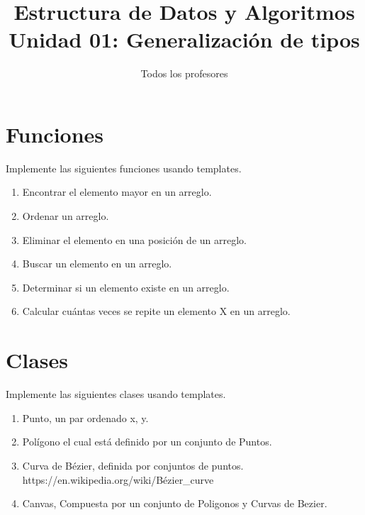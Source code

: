 \documentclass{article}
\title{Estructura de Datos y Algoritmos \\
  \large Unidad 01: Generalización de tipos}
\author{Todos los profesores}
\date{}
\begin{document}
\maketitle

\section{Funciones}

Implemente las siguientes funciones usando templates.
\begin{enumerate}
\item Encontrar el elemento mayor en un arreglo.
\item Ordenar un arreglo.
\item Eliminar el elemento en una posición de un arreglo.
\item Buscar un elemento en un arreglo.
\item Determinar si un elemento existe en un arreglo.
\item Calcular cuántas veces se repite un elemento X en un arreglo.
\end{enumerate}

\section{Clases}

Implemente las siguientes clases usando templates.
\begin{enumerate}
\item Punto, un par ordenado x, y.
\item Polígono el cual está definido por un conjunto de Puntos.
\item Curva de Bézier, definida por conjuntos de puntos.
  https://en.wikipedia.org/wiki/Bézier\_curve
\item Canvas, Compuesta por un conjunto de Poligonos y Curvas de Bezier.
\end{enumerate}
\end{document}
